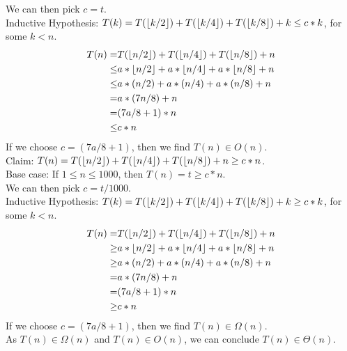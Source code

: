 \documentclass{assignment}
\DeclarePairedDelimiter\floor{\lfloor}{\rfloor}
\begin{document}
\begin{problemlist}
\begin{answer}
\begin{enumerate}
We can then pick $c=t$.\\
Inductive Hypothesis: $T(k)=T(\floor{k/2})+T(\floor{k/4})+T(\floor{k/8})+k \le c*k$, for some $k < n$.\\
\begin{align*}
T(n)=&T(\floor{n/2}) + T(\floor{n/4}) + T(\floor{n/8}) + n\\
\le&a*\floor{n/2} + a*\floor{n/4} + a*\floor{n/8} + n\\
\le&a*(n/2) + a*(n/4) + a*(n/8) + n\\
=&a*(7n/8) + n\\
=&(7a/8 + 1) * n\\
\le&c*n\\
\end{align*}
If we choose $c=(7a/8 + 1)$, then we find $T(n)\in O(n)$.\\

Claim: $T(n)=T(\floor{n/2})+T(\floor{n/4})+T(\floor{n/8})+n \ge c*n$.\\
Base case: If $1 \le n \le 1000$, then $T(n) = t \ge c*n$.\\
We can then pick $c=t/1000$.\\
Inductive Hypothesis: $T(k)=T(\floor{k/2})+T(\floor{k/4})+T(\floor{k/8})+k \ge c*k$, for some $k < n$.\\
\begin{align*}
T(n)=&T(\floor{n/2}) + T(\floor{n/4}) + T(\floor{n/8}) + n\\
\ge&a*\floor{n/2} + a*\floor{n/4} + a*\floor{n/8} + n\\
\ge&a*(n/2) + a*(n/4) + a*(n/8) + n\\
=&a*(7n/8) + n\\
=&(7a/8 + 1) * n\\
\ge&c*n\\
\end{align*}
If we choose $c=(7a/8 + 1)$, then we find $T(n)\in \Omega(n)$.\\
As $T(n)\in \Omega(n)$ and $T(n)\in O(n)$, we can conclude $T(n)\in \Theta (n)$.\\
\end{enumerate}
\end{answer}


\end{problemlist}
\end{document}

